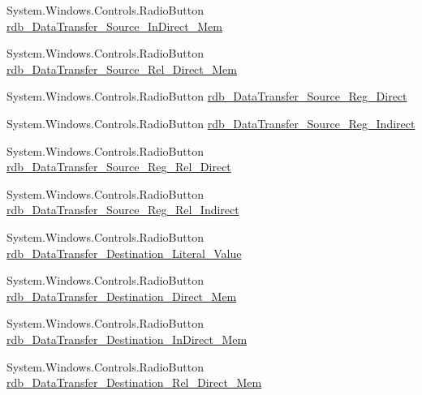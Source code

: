 \begin{DoxyCompactItemize}
System.\+Windows.\+Controls.\+Radio\+Button \hyperlink{class_c_p_u___o_s___simulator_1_1_instructions_window_a309c6122933369bff16cbb3deb41a857}{rdb\+\_\+\+Data\+Transfer\+\_\+\+Source\+\_\+\+In\+Direct\+\_\+\+Mem}
\item 
System.\+Windows.\+Controls.\+Radio\+Button \hyperlink{class_c_p_u___o_s___simulator_1_1_instructions_window_a6f61be621d18aff9d04be399cdf2efb1}{rdb\+\_\+\+Data\+Transfer\+\_\+\+Source\+\_\+\+Rel\+\_\+\+Direct\+\_\+\+Mem}
\item 
System.\+Windows.\+Controls.\+Radio\+Button \hyperlink{class_c_p_u___o_s___simulator_1_1_instructions_window_a0f32cb023b7f540704a46646bc88daa8}{rdb\+\_\+\+Data\+Transfer\+\_\+\+Source\+\_\+\+Reg\+\_\+\+Direct}
\item 
System.\+Windows.\+Controls.\+Radio\+Button \hyperlink{class_c_p_u___o_s___simulator_1_1_instructions_window_af19244aa546ce786d08bcf7e1aa87133}{rdb\+\_\+\+Data\+Transfer\+\_\+\+Source\+\_\+\+Reg\+\_\+\+Indirect}
\item 
System.\+Windows.\+Controls.\+Radio\+Button \hyperlink{class_c_p_u___o_s___simulator_1_1_instructions_window_a5b7f0fbfe97adafa2d8b1db64ddc1dc2}{rdb\+\_\+\+Data\+Transfer\+\_\+\+Source\+\_\+\+Reg\+\_\+\+Rel\+\_\+\+Direct}
\item 
System.\+Windows.\+Controls.\+Radio\+Button \hyperlink{class_c_p_u___o_s___simulator_1_1_instructions_window_a82bf19eae75ed59c20f276c40ec7bb54}{rdb\+\_\+\+Data\+Transfer\+\_\+\+Source\+\_\+\+Reg\+\_\+\+Rel\+\_\+\+Indirect}
\item 
System.\+Windows.\+Controls.\+Radio\+Button \hyperlink{class_c_p_u___o_s___simulator_1_1_instructions_window_af75116cac9624fdf726d3f892c2ddcdb}{rdb\+\_\+\+Data\+Transfer\+\_\+\+Destination\+\_\+\+Literal\+\_\+\+Value}
\item 
System.\+Windows.\+Controls.\+Radio\+Button \hyperlink{class_c_p_u___o_s___simulator_1_1_instructions_window_ad1efeb9590815a2c3a9b03f6bbb2c849}{rdb\+\_\+\+Data\+Transfer\+\_\+\+Destination\+\_\+\+Direct\+\_\+\+Mem}
\item 
System.\+Windows.\+Controls.\+Radio\+Button \hyperlink{class_c_p_u___o_s___simulator_1_1_instructions_window_a675686f5e50349d76227b4a2bed048f8}{rdb\+\_\+\+Data\+Transfer\+\_\+\+Destination\+\_\+\+In\+Direct\+\_\+\+Mem}
\item 
System.\+Windows.\+Controls.\+Radio\+Button \hyperlink{class_c_p_u___o_s___simulator_1_1_instructions_window_a5cb6e55fc3a0dac7c4b2da36b1153328}{rdb\+\_\+\+Data\+Transfer\+\_\+\+Destination\+\_\+\+Rel\+\_\+\+Direct\+\_\+\+Mem}

\end{DoxyCompactItemize}
